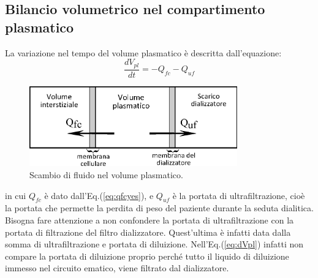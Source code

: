 \subsection{Bilancio volumetrico nel compartimento plasmatico}
La variazione nel tempo del volume plasmatico è descritta dall'equazione:
\begin{equation}\label{eq:dVpl}
	\frac{dV_{pl}}{dt} = -Q_{fc} - Q_{uf}
\end{equation}
\begin{figure}[htb]
	\centering
		\includegraphics[width=0.8\textwidth]{immagini/vol_dia.eps}
				\caption{Scambio di fluido nel volume plasmatico.}
\end{figure}
in cui $Q_{fc}$ è dato dall'Eq.(\ref{eq:qfcyes}), e $Q_{uf}$ è la portata di ultrafiltrazione, cioè la portata che permette la perdita di peso del paziente durante la seduta dialitica. Bisogna fare attenzione a non confondere la portata di ultrafiltrazione con la portata di filtrazione del filtro dializzatore. Quest'ultima è infatti data dalla somma di ultrafiltrazione e portata di diluizione. Nell'Eq.(\ref{eq:dVpl}) infatti non compare la portata di diluizione proprio perché tutto il liquido di diluizione immesso nel circuito ematico, viene filtrato dal dializzatore.